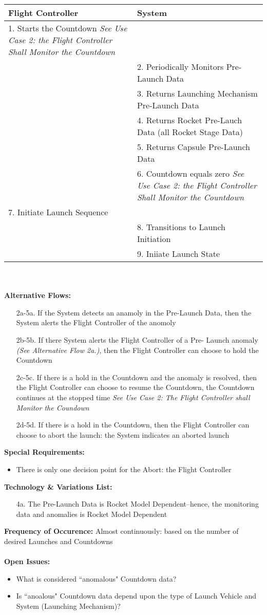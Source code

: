 \documentclass[letterpaper]{article}
\begin{document}
\begin{tabular}{|p{5.75cm}|p{5.75cm}|}\hline
\textbf{Flight Controller}&\textbf{System}\\\hline
1. Starts the Countdown \textit{See Use Case 2:  the Flight
Controller Shall Monitor the Countdown} & \\\hline
& 2. Periodically Monitors Pre-Launch Data\\\hline
& 3. Returns Launching Mechanism Pre-Launch Data\\\hline
& 4. Returns Rocket Pre-Lauch Data (all Rocket Stage Data)\\\hline
& 5. Returns Capsule Pre-Launch Data\\\hline
& 6. Countdown equals zero \textit{See Use Case 2:  the Flight
Controller Shall Monitor the Countdown}\\\hline
7. Initiate Launch Sequence & \\\hline
& 8.  Transitions to Launch Initiation\\\hline
& 9.  Iniiate Launch State\\\hline
\end{tabular}\\\\
\textbf{Alternative Flows:}
\begin{itemize}
\item[2a-5a.]If the System detects an anamoly in the Pre-Launch Data,
then the System alerts the Flight Controller of the anomoly
\item[2b-5b.]If there System alerts the Flight Controller of a Pre-
Launch anomaly \textit{(See Alternative Flow 2a.)}, then the Flight
Controller can choose to hold the Countdown
\item[2c-5c.]If there is a hold in the Countdown and the anomaly is
resolved, then the Flight Controller can choose to resume the
Countdown, the Countdown continues at the stopped time \textit{See
Use Case 2:  The Flight Controller shall Monitor the Coundown}
\item[2d-5d.]If there is a hold in the Countdown, then the Flight
Controller can choose to abort the launch:  the System indicates an
aborted launch
\end{itemize}
\textbf{Special Requirements:}
\begin{itemize}
\item There is only one decision point for the Abort:  the Flight
Controller
\end{itemize}
\textbf{Technology \& Variations List:}
\begin{itemize}
\item [4a.]The Pre-Launch Data is Rocket Model Dependent--hence,
the monitoring data and anomalies is Rocket Model Dependent
\end{itemize}
\textbf{Frequency of Occurence:  }Almost continuously:  based on the
number of desired Launches and Countdowns\\\\
\textbf{Open Issues:}
\begin{itemize}
\item What is considered ``anomalous" Countdown data?
\item Is ``anoalous" Countdown data depend upon the type of Launch
Vehicle and System (Launching Mechanism)?
\end{itemize}
\end{document}
